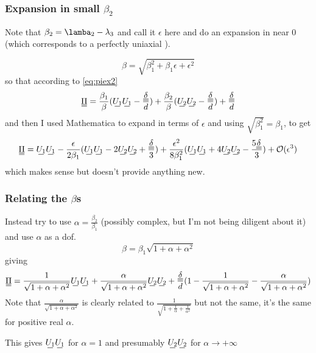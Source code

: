 \documentclass[11pt]{article}
\begin{document}
\subsubsection{Expansion in small $\beta_2$}
Note that $\beta_2 = \lamba_2 - \lambda_3$ and call it $\epsilon$ here and do an expansion in near 0 (which corresponds to a perfectly uniaxial \EE).

\begin{equation}
    \beta = \sqrt{\beta_1^2+\beta_1\epsilon+\epsilon^2}
\end{equation}
so that according to \cref{eq:piex2}
\begin{equation}
    \du{\Pi} = \frac{\beta_1}{\beta}(\su{U_1}\su{U_1} - \frac{\du{\delta}}{d}) + \frac{\beta_2}{\beta}(\su{U_2}\su{U_2} - \frac{\du{\delta}}{d}) + \frac{\du{\delta}}{d}
\end{equation}
and then I used Mathematica to expand in terms of $\epsilon$ and using $\sqrt{\beta_1^2}=\beta_1$, to get
\begin{equation}
    \du{\Pi} = \su{U_1}\su{U_1} - \frac{\epsilon}{2\beta_1}(\su{U_1}\su{U_1} - 2\su{U_2}\su{U_2} + \frac{\du{\delta}}{3}) + \frac{\epsilon^2}{8\beta_1^2}(\su{U_1}\su{U_1} + 4\su{U_2}\su{U_2} - \frac{5\du{\delta}}{3}) + \mathcal{O}(\epsilon^3)
\end{equation}
which makes sense but doesn't provide anything new.

\subsubsection{Relating the $\beta$s}
Instead try to use $\alpha=\frac{\beta_2}{\beta_1}$ (possibly complex, but I'm not being diligent about it) and use $\alpha$ as a dof.
\begin{equation}
    \beta = \beta_1 \sqrt{1 + \alpha + \alpha^2}
\end{equation}
giving
\begin{equation}
    \du{\Pi} = \frac{1}{\sqrt{1 + \alpha + \alpha^2}}\su{U_1}\su{U_1} + \frac{\alpha}{\sqrt{1 + \alpha + \alpha^2}}\su{U_2}\su{U_2} + \frac{\du{\delta}}{d}(1 - \frac{1}{\sqrt{1 + \alpha + \alpha^2}} - \frac{\alpha}{\sqrt{1 + \alpha + \alpha^2}})
\end{equation}
Note that $\frac{\alpha}{\sqrt{1 + \alpha + \alpha^2}}$ is clearly related to $\frac{1}{\sqrt{1 + \frac{1}{\alpha} + \frac{1}{\alpha^2}}}$ but not the same, it's the same for positive real $\alpha$.

This gives $\su{U_1}\su{U_1}$ for $\alpha=1$ and presumably $\su{U_2}\su{U_2}$ for $\alpha \rightarrow +\infty$
\end{document}
